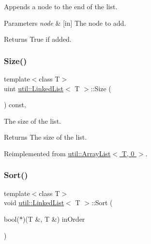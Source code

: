 Appends a node to the end of the list. 


\begin{DoxyParams}{Parameters}
{\em node} & \mbox{[}in\mbox{]} The node to add. \\
\hline
\end{DoxyParams}
\begin{DoxyReturn}{Returns}
True if added. 
\end{DoxyReturn}
\mbox{\label{classutil_1_1LinkedList_a83784f0749538889da04deb74b2bdd95}} 
\subsubsection{\texorpdfstring{Size()}{Size()}}
{\footnotesize\ttfamily template$<$class T$>$ \\
uint \hyperlink{classutil_1_1LinkedList}{util\+::\+Linked\+List}$<$ T $>$\+::Size (\begin{DoxyParamCaption}{ }\end{DoxyParamCaption}) const\hspace{0.3cm}{\ttfamily [inline]}, {\ttfamily [virtual]}}



The size of the list. 

\begin{DoxyReturn}{Returns}
The size of the list. 
\end{DoxyReturn}


Reimplemented from \hyperlink{classutil_1_1ArrayList_ae098e879892c23b682edc4b023a770de}{util\+::\+Array\+List$<$ T, 0 $>$}.

\mbox{\label{classutil_1_1LinkedList_ab77a211e4961b76e7b68b5d3ff1cd7ee}} 
\subsubsection{\texorpdfstring{Sort()}{Sort()}}
{\footnotesize\ttfamily template$<$class T$>$ \\
void \hyperlink{classutil_1_1LinkedList}{util\+::\+Linked\+List}$<$ T $>$\+::Sort (\begin{DoxyParamCaption}\item[{bool($\ast$)(T \&, T \&)}]{in\+Order }\end{DoxyParamCaption})\hspace{0.3cm}{\ttfamily [inline]}}



